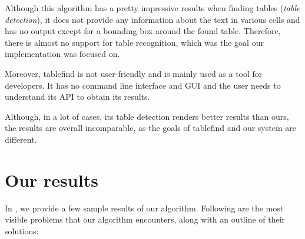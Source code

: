Although this algorithm has a pretty impressive results when finding tables (\emph{table detection}), it does not provide any information about the text in various cells and has no output except for a bounding box around the found table. Therefore, there is almost no support for table recognition, which was the goal our implementation was focused on.

Moreover, tablefind is not user-friendly and is mainly used as a tool for developers. It has no command line interface and GUI and the user needs to understand its API to obtain its results.

Although, in a lot of cases, its table detection renders better results than ours, the results are overall incomparable, as the goals of tablefind and our system are different.

\section{Our results}

In , we provide a few sample results of our algorithm. Following are the most visible problems that our algorithm encounters, along with an outline of their solutions:

